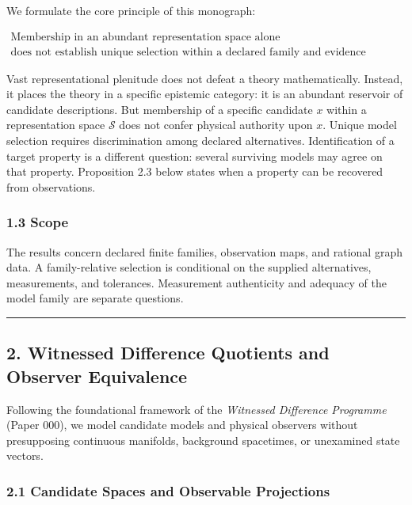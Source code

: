 \documentclass[
  10pt,
]{article}
\begin{document}
We formulate the core principle of this monograph:

\hypertarget{math-E0010-0002}{}{\[\boxed{\begin{array}{c}
\text{Membership in an abundant representation space alone} \\
\text{does not establish unique selection within a declared family and evidence record.}
\end{array}}\]}

Vast representational plenitude does not defeat a theory mathematically. Instead, it places the theory in a specific epistemic category: it is an abundant reservoir of candidate descriptions. But membership of a specific candidate \hypertarget{math-E0011-0003}{}{\(x\)} within a representation space \hypertarget{math-E0012-0004}{}{\(\mathcal{S}\)} does not confer physical authority upon \hypertarget{math-E0011-0005}{}{\(x\)}. Unique model selection requires discrimination among declared alternatives. Identification of a target property is a different question: several surviving models may agree on that property. Proposition 2.3 below states when a property can be recovered from observations.

\subsubsection{1.3 Scope}\label{scope}

The results concern declared finite families, observation maps, and rational graph data. A family-relative selection is conditional on the supplied alternatives, measurements, and tolerances. Measurement authenticity and adequacy of the model family are separate questions.

\begin{center}\rule{0.5\linewidth}{0.5pt}\end{center}

\subsection{2. Witnessed Difference Quotients and Observer Equivalence}\label{witnessed-difference-quotients-and-observer-equivalence}

Following the foundational framework of the \emph{Witnessed Difference Programme} (Paper 000), we model candidate models and physical observers without presupposing continuous manifolds, background spacetimes, or unexamined state vectors.

\subsubsection{2.1 Candidate Spaces and Observable Projections}\label{candidate-spaces-and-observable-projections}
\end{document}
